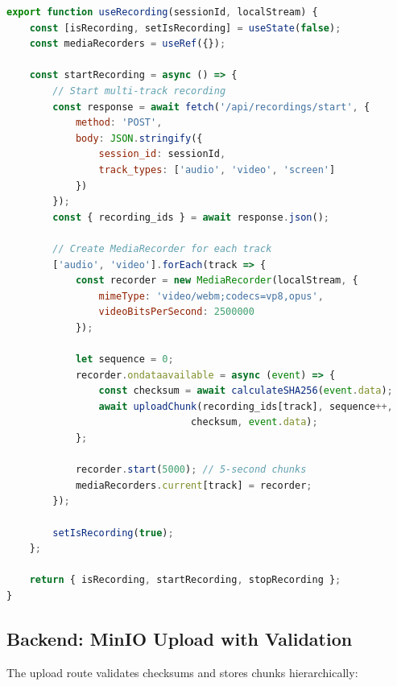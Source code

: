 \documentclass[12pt,a4paper]{article}
\begin{document}
\begin{lstlisting}[language=JavaScript, caption=Recording Hook (Condensed), basicstyle=\ttfamily\scriptsize]
export function useRecording(sessionId, localStream) {
    const [isRecording, setIsRecording] = useState(false);
    const mediaRecorders = useRef({});

    const startRecording = async () => {
        // Start multi-track recording
        const response = await fetch('/api/recordings/start', {
            method: 'POST',
            body: JSON.stringify({
                session_id: sessionId,
                track_types: ['audio', 'video', 'screen']
            })
        });
        const { recording_ids } = await response.json();

        // Create MediaRecorder for each track
        ['audio', 'video'].forEach(track => {
            const recorder = new MediaRecorder(localStream, {
                mimeType: 'video/webm;codecs=vp8,opus',
                videoBitsPerSecond: 2500000
            });

            let sequence = 0;
            recorder.ondataavailable = async (event) => {
                const checksum = await calculateSHA256(event.data);
                await uploadChunk(recording_ids[track], sequence++,
                                checksum, event.data);
            };

            recorder.start(5000); // 5-second chunks
            mediaRecorders.current[track] = recorder;
        });

        setIsRecording(true);
    };

    return { isRecording, startRecording, stopRecording };
}
\end{lstlisting}

\subsection{Backend: MinIO Upload with Validation}

The upload route validates checksums and stores chunks hierarchically:
\end{document}
